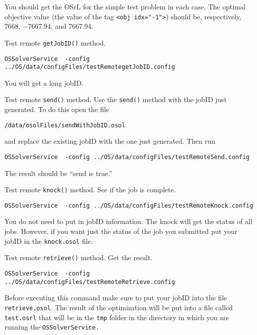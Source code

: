 \begin{itemize}
\begin{itemize}
You should get the OSrL for the simple test problem in each case. The optimal objective value
(the value of the tag {\tt <obj idx="-1">}) should be, respectively, 7668, $-$7667.94, and 7667.94.

\vskip 10pt


 Test remote {\tt getJobID()} method.


\begin{verbatim}
OSSolverService  -config ../OS/data/configFiles/testRemotegetJobID.config
\end{verbatim}



You will get a long jobID.


\vskip 10pt


 Test remote {\tt send()} method. Use the {\tt send()} method with the jobID just  generated.  To do this open the file
\begin{verbatim}
/data/osolFiles/sendWithJobID.osol
\end{verbatim}
and replace the existing jobID with the one just generated.  Then run
\begin{verbatim}
OSSolverService  -config ../OS/data/configFiles/testRemoteSend.config
\end{verbatim}
The result should be ``send is true.''

\vskip 10pt

 Test remote {\tt knock()} method.  See if the  job is complete.


\begin{verbatim}
OSSolverService  -config ../OS/data/configFiles/testRemoteKnock.config
\end{verbatim}

You do not need to put in jobID information. The knock will get the status of all jobs. However, if you want just the status of the job you submitted put your jobID in the {\tt knock.osol} file. 

\vskip 10pt

 Test remote {\tt retrieve()} method. Get the result.

\begin{verbatim}
OSSolverService  -config ../OS/data/configFiles/testRemoteRetrieve.config
\end{verbatim}
Before executing this command make sure to put your jobID into the file {\tt retrieve.osol}.  
The result of the optimization will be put into a file called {\tt test.osrl} that will be in the {\tt tmp} folder in the directory in which you are running the {\tt OSSolverService.} 


\end{itemize}
\end{itemize}
